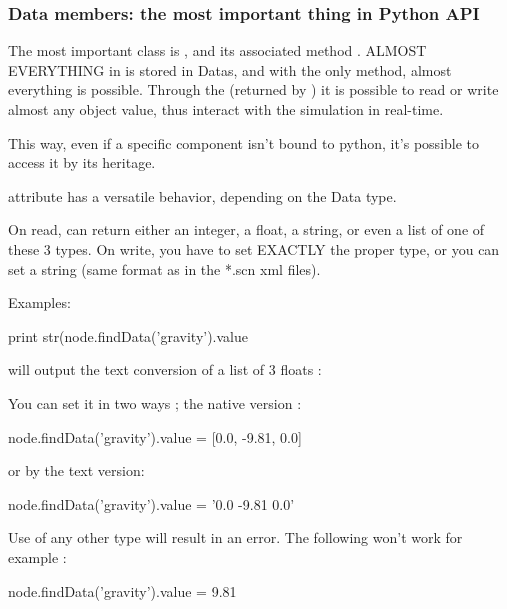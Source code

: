 \subsubsection{Data members: the most important thing in \sofa Python API}

The most important class is , and its associated method .
ALMOST EVERYTHING in \sofa is stored in Datas, and with the only  method, almost everything is possible.
Through the  (returned by  ) it is possible to read or write almost any object value, thus interact with the simulation in real-time.

This way, even if a specific component isn't bound to python, it's possible to access it by its  heritage.

 attribute has a versatile behavior, depending on the Data type.

On read,  can return either an integer, a float, a string, or even a list of one of these 3 types.
On write, you have to set EXACTLY the proper type, or you can set a string (same format as in the *.scn xml files).

Examples:

\begin{code_python}
print str(node.findData('gravity').value
\end{code_python}
will output the text conversion of a list of 3 floats :
\begin{code_bash}
[0.0, -9.81, 0.0]
\end{code_bash}

You can set it in two ways ; the native version :
\begin{code_python}
node.findData('gravity').value = [0.0, -9.81, 0.0]
\end{code_python}
or by the text version:
\begin{code_python}
node.findData('gravity').value = '0.0  -9.81 0.0'
\end{code_python}

Use of any other type will result in an error.
The following won't work for example :
\begin{code_python}
node.findData('gravity').value = 9.81
\end{code_python}

